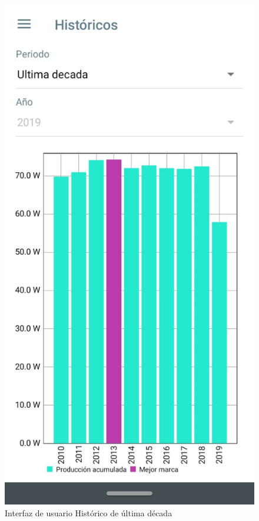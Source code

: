 \begin{figure}[H]
	\centering
	\includegraphics[scale=0.4]{Capitulo4/software/submodulos/images/man30.png}
	\caption{Interfaz de usuario Histórico de última década}
	\label{fig:Historico ultima decada}
\end{figure}


